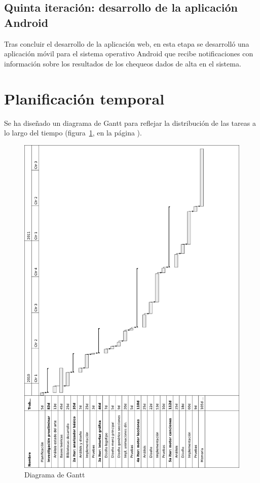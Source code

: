 \subsection{Quinta iteración: desarrollo de la aplicación Android}

Tras concluir el desarrollo de la aplicación web, en esta etapa se desarrolló
una aplicación móvil para el sistema operativo Android que recibe notificaciones
con información sobre los resultados de los chequeos dados de alta en el sistema.

\section{Planificación temporal}
\label{sec:planificacion}
Se ha diseñado un diagrama de Gantt para reflejar la distribución de las tareas
a lo largo del tiempo (figura~\ref{fig:gantt}, en la página \pageref{fig:gantt}).

\begin{figure}[htbp]
  \centering
  \includegraphics[width=\textwidth]{2_calendario/imagen_diagrama_gantt}
  \caption{Diagrama de Gantt}
  \label{fig:gantt}
\end{figure}

